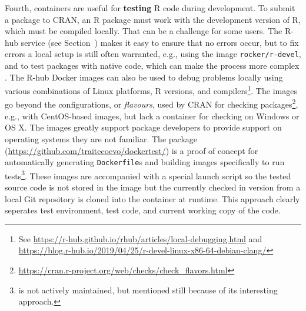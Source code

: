 Fourth, containers are useful for \textbf{testing} R code during
development. To submit a package to CRAN, an R package must work with
the development version of R, which must be compiled locally. That can
be a challenge for some users. The R-hub service (see
Section~) makes it easy to ensure that no errors occur,
but to fix errors a local setup is still often warranted, e.g., using
the image \texttt{rocker/r-devel}, and to test packages with native
code, which can make the process more complex
\citep[cf.][]{eckert_building_2018}. The R-hub Docker images can also be
used to debug problems locally using various combinations of Linux
platforms, R versions, and
compilers\footnote{See \href{https://r-hub.github.io/rhub/articles/local-debugging.html}{https://r-hub.github.io/rhub/articles/local-debugging.html} and \href{https://blog.r-hub.io/2019/04/25/r-devel-linux-x86-64-debian-clang/}{https://blog.r-hub.io/2019/04/25/r-devel-linux-x86-64-debian-clang/}}.
The images go beyond the configurations, or \emph{flavours}, used by
CRAN for checking
packages\footnote{\href{https://cran.r-project.org/web/checks/check_flavors.html}{https://cran.r-project.org/web/checks/check\_flavors.html}},
e.g., with CentOS-based images, but lack a container for checking on
Windows or OS X. The images greatly support package developers to
provide support on operating systems they are not familiar. The package
 (\url{https://github.com/traitecoevo/dockertest/}) is a
proof of concept for automatically generating \texttt{Dockerfile}s and
building images specifically to run
tests\footnote{ is not actively maintained, but mentioned still because of its interesting approach.}.
These images are accompanied with a special launch script so the tested
source code is not stored in the image but the currently checked in
version from a local Git repository is cloned into the container at
runtime. This approach clearly seperates test environment, test code,
and current working copy of the code.

